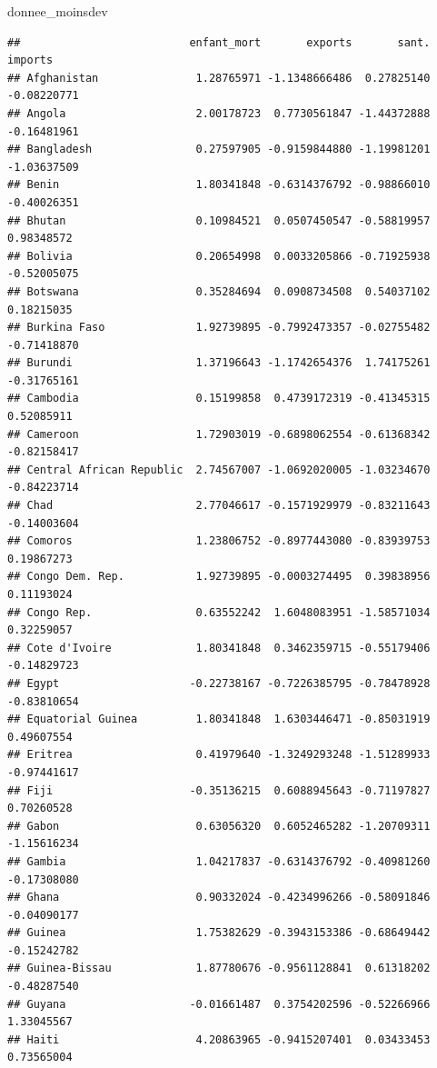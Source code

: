 \documentclass[
]{article}
\newenvironment{Shaded}{}{}
\newcommand{\NormalTok}[1]{#1}
\begin{document}
\begin{Shaded}
\begin{Highlighting}[]
\NormalTok{donnee\_moinsdev}
\end{Highlighting}
\end{Shaded}

\begin{verbatim}
##                          enfant_mort       exports       sant.     imports
## Afghanistan               1.28765971 -1.1348666486  0.27825140 -0.08220771
## Angola                    2.00178723  0.7730561847 -1.44372888 -0.16481961
## Bangladesh                0.27597905 -0.9159844880 -1.19981201 -1.03637509
## Benin                     1.80341848 -0.6314376792 -0.98866010 -0.40026351
## Bhutan                    0.10984521  0.0507450547 -0.58819957  0.98348572
## Bolivia                   0.20654998  0.0033205866 -0.71925938 -0.52005075
## Botswana                  0.35284694  0.0908734508  0.54037102  0.18215035
## Burkina Faso              1.92739895 -0.7992473357 -0.02755482 -0.71418870
## Burundi                   1.37196643 -1.1742654376  1.74175261 -0.31765161
## Cambodia                  0.15199858  0.4739172319 -0.41345315  0.52085911
## Cameroon                  1.72903019 -0.6898062554 -0.61368342 -0.82158417
## Central African Republic  2.74567007 -1.0692020005 -1.03234670 -0.84223714
## Chad                      2.77046617 -0.1571929979 -0.83211643 -0.14003604
## Comoros                   1.23806752 -0.8977443080 -0.83939753  0.19867273
## Congo Dem. Rep.           1.92739895 -0.0003274495  0.39838956  0.11193024
## Congo Rep.                0.63552242  1.6048083951 -1.58571034  0.32259057
## Cote d'Ivoire             1.80341848  0.3462359715 -0.55179406 -0.14829723
## Egypt                    -0.22738167 -0.7226385795 -0.78478928 -0.83810654
## Equatorial Guinea         1.80341848  1.6303446471 -0.85031919  0.49607554
## Eritrea                   0.41979640 -1.3249293248 -1.51289933 -0.97441617
## Fiji                     -0.35136215  0.6088945643 -0.71197827  0.70260528
## Gabon                     0.63056320  0.6052465282 -1.20709311 -1.15616234
## Gambia                    1.04217837 -0.6314376792 -0.40981260 -0.17308080
## Ghana                     0.90332024 -0.4234996266 -0.58091846 -0.04090177
## Guinea                    1.75382629 -0.3943153386 -0.68649442 -0.15242782
## Guinea-Bissau             1.87780676 -0.9561128841  0.61318202 -0.48287540
## Guyana                   -0.01661487  0.3754202596 -0.52266966  1.33045567
## Haiti                     4.20863965 -0.9415207401  0.03433453  0.73565004

\end{verbatim}
\end{document}
